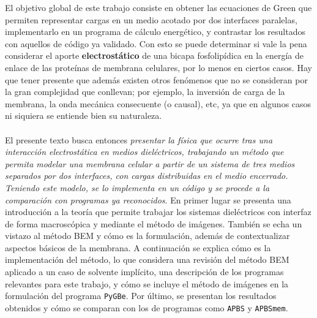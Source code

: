 \documentclass[12pt, oneside, numbers, spanish]{ezthesis}
\numberwithin{equation}{section}
\begin{document}
El objetivo global de este trabajo consiste en obtener las ecuaciones de Green que permiten representar cargas en un medio acotado por dos interfaces paralelas, implementarlo en un programa de cálculo energético, y contrastar los resultados con aquellos de código ya validado. Con esto se puede determinar si vale la pena considerar el aporte \textbf{electrostático} de una bicapa fosfolipídica en la energía de enlace de las proteínas de membrana celulares, por lo menos en ciertos casos. Hay que tener presente que además existen otros fenómenos que no se consideran por la gran complejidad que conllevan; por ejemplo, la inversión de carga de la membrana, la onda mecánica consecuente (o causal), etc, ya que en algunos casos ni siquiera se entiende bien su naturaleza.\\\\
El presente texto busca entonces \textit{presentar la física que ocurre tras una interacción electrostática en medios dieléctricos, trabajando un método que permita modelar una membrana celular a partir de un sistema de tres medios separados por dos interfaces, con cargas distribuidas en el medio encerrado. Teniendo este modelo, se lo implementa en un código y se procede a la comparación con programas ya reconocidos}.
En primer lugar se presenta una introducción a la teoría que permite trabajar los sistemas dieléctricos con interfaz de forma macroscópica y mediante el método de imágenes. También se echa un vistazo al método BEM y cómo es la formulación, además de contextualizar aspectos básicos de la membrana. A continuación se explica cómo es la implementación del método, lo que considera una revisión del método BEM aplicado a un caso de solvente implícito, una descripción de los programas relevantes para este trabajo, y cómo se incluye el método de imágenes en la formulación del programa \texttt{PyGBe}. Por último, se presentan los resultados obtenidos y cómo se comparan con los de programas como \texttt{APBS} y \texttt{APBSmem}.


\end{document}
